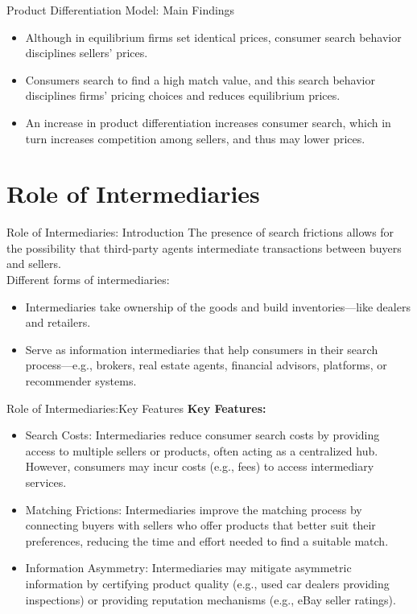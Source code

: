 \documentclass[aspectratio=169]{beamer}  %
\begin{document}
\begin{frame}{Product Differentiation Model: Main Findings}
    \begin{itemize}
        \item Although in equilibrium firms set identical prices, consumer search behavior disciplines sellers’ prices.
        \item Consumers search to find a high match value, and this search behavior disciplines firms’ pricing choices and reduces equilibrium prices.
        \item An increase in product differentiation increases consumer search, which in turn increases competition among sellers, and thus may lower prices.
    \end{itemize}
\end{frame}


\section{Role of Intermediaries}
\begin{frame}{Role of Intermediaries: Introduction}
    The presence of search frictions allows for the possibility that third-party agents intermediate transactions between buyers and sellers.\\
    Different forms of intermediaries:
    \begin{itemize}
        \item Intermediaries take ownership of the goods and build inventories—like dealers and retailers.
        \item Serve as information intermediaries that help consumers in their search process—e.g., brokers, real estate agents, financial advisors, platforms, or recommender systems.
    \end{itemize}
\end{frame}


\begin{frame}{Role of Intermediaries:Key Features}
    \textbf{Key Features:}
    \begin{itemize}
        \item Search Costs: Intermediaries reduce consumer search costs by providing access to multiple sellers or products, often acting as a centralized hub. However, consumers may incur costs (e.g., fees) to access intermediary services.
        \item Matching Frictions: Intermediaries improve the matching process by connecting buyers with sellers who offer products that better suit their preferences, reducing the time and effort needed to find a suitable match.
        \item Information Asymmetry: Intermediaries may mitigate asymmetric information by certifying product quality (e.g., used car dealers providing inspections) or providing reputation mechanisms (e.g., eBay seller ratings).
    \end{itemize}
\end{frame}
\end{document}
